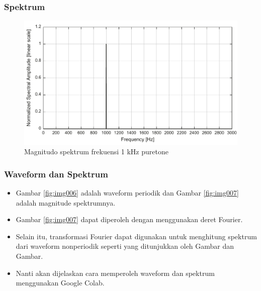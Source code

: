 \documentclass[pdflatex,compress]{beamer}
\begin{document}
\begin{frame}
	\frametitle{Spektrum}
	\begin{figure}
		\centering
		\includegraphics[width=0.7\linewidth]{img/img005}
		\caption{Magnitudo spektrum frekuensi 1 kHz puretone}
		\label{fig:img005}
	\end{figure}
\end{frame}

\begin{frame}
	\frametitle{Waveform dan Spektrum}
	\begin{itemize}
		\item Gambar \ref{fig:img006} adalah waveform periodik dan Gambar \ref{fig:img007} adalah magnitude spektrumnya.
		\item Gambar \ref{fig:img007} dapat diperoleh dengan menggunakan deret Fourier.
		\item Selain itu, transformasi Fourier dapat digunakan untuk menghitung spektrum dari waveform nonperiodik seperti yang ditunjukkan oleh Gambar dan Gambar.
		\item Nanti akan dijelaskan cara memperoleh waveform dan spektrum menggunakan Google Colab.
	\end{itemize}
\end{frame}
\end{document}
